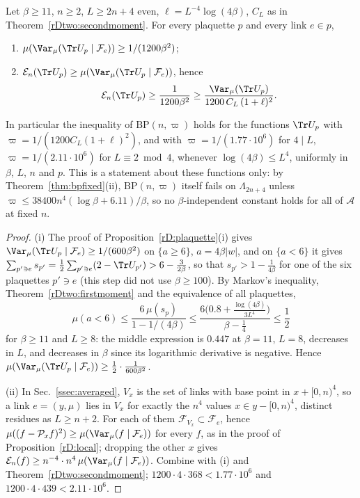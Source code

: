 \begin{corollary}
\label{rDtwo:bpplaquette}
Let $\beta\ge11$, $n\ge2$, $L\ge2n+4$ even, $\ell=L^{-4}\log(4\beta)$, $C_L$
as in Theorem~\ref{rDtwo:secondmoment}. For every plaquette $p$ and every
link $e\in p$,
\begin{enumerate}[label=\textup{(\roman*)},leftmargin=*]
\item $\mu(\Var_\mu(\Tr U_p\mid\mathcal F_e))\ge1/(1200\beta^2)$;
\item $\mathcal E_n(\Tr U_p)\ge\mu(\Var_\mu(\Tr U_p\mid\mathcal F_e))$, hence
\[
\mathcal E_n(\Tr U_p)\ge\frac1{1200\beta^2}\ge
\frac{\Var_\mu(\Tr U_p)}{1200\,C_L\,(1+\ell)^2}.
\]
\end{enumerate}
In particular the inequality of $\mathrm{BP}(n,\varpi)$ holds for the
functions $\Tr U_p$ with $\varpi=1/(1200C_L(1+\ell)^2)$, and with $\varpi=
1/(1.77\cdot10^6)$ for $4\mid L$, $\varpi=1/(2.11\cdot10^6)$ for $L\equiv2
\bmod4$, whenever $\log(4\beta)\le L^4$, uniformly in $\beta$, $L$, $n$ and
$p$. This is a statement about these functions only: by
Theorem~\ref{thm:bpfixed}(ii), $\mathrm{BP}(n,\varpi)$ itself fails on
$\Lambda_{2n+4}$ unless $\varpi\le38400n^4(\log\beta+6.11)/\beta$, so no
$\beta$-independent constant holds for all of $\mathcal A$ at fixed $n$.
\end{corollary}

\begin{proof}
(i) The proof of Proposition~\ref{rD:plaquette}(i) gives $\Var_\mu(\Tr U_p
\mid\mathcal F_e)\ge1/(600\beta^2)$ on $\{a\ge6\}$, $a=4\beta\lvert w\rvert$,
and on $\{a<6\}$ it gives $\sum_{p'\ni e}s_{p'}=\frac12\sum_{p'\ni e}(2-\Tr
U_{p'})>6-\frac3{2\beta}$, so that $s_{p'}>1-\frac1{4\beta}$ for one of the
six plaquettes $p'\ni e$ (this step did not use $\beta\ge100$). By Markov's
inequality, Theorem~\ref{rDtwo:firstmoment} and the equivalence of all
plaquettes,
\[
\mu(a<6)\le\frac{6\,\mu(s_p)}{1-1/(4\beta)}\le\frac{6\bigl(0.8+\frac{\log(4
\beta)}{3L^4}\bigr)}{\beta-\frac14}\le\frac12
\]
for $\beta\ge11$ and $L\ge8$: the middle expression is $0.447$ at $\beta=11$,
$L=8$, decreases in $L$, and decreases in $\beta$ since its logarithmic
derivative is negative. Hence $\mu(\Var_\mu(\Tr U_p\mid\mathcal F_e))\ge\frac
12\cdot\frac1{600\beta^2}$.

(ii) In Sec.~\ref{ssec:averaged}, $V_x$ is the set of links with base point
in $x+[0,n)^4$, so a link $e=(y,\mu)$ lies in $V_x$ for exactly the $n^4$
values $x\in y-[0,n)^4$, distinct residues as $L\ge n+2$. For each of them
$\mathcal F_{V_x}\subset\mathcal F_e$, hence $\mu((f-\mathcal P_xf)^2)\ge\mu(
\Var_\mu(f\mid\mathcal F_e))$ for every $f$, as in the proof of
Proposition~\ref{rD:local}; dropping the other $x$ gives $\mathcal E_n(f)\ge
n^{-4}\cdot n^4\,\mu(\Var_\mu(f\mid\mathcal F_e))$. Combine with (i) and
Theorem~\ref{rDtwo:secondmoment}; $1200\cdot4\cdot368<1.77\cdot10^6$ and
$1200\cdot4\cdot439<2.11\cdot10^6$.
\end{proof}

